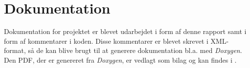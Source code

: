 \section{Dokumentation}
\label{sec:dokumentation}
Dokumentation for projektet er blevet udarbejdet i form af denne rapport samt i form af kommentarer i koden.
Disse kommentarer er blevet skrevet i XML-format, så de kan blive brugt til at generere dokumentation bl.a. med \emph{Doxygen}.
Den PDF, der er genereret fra \emph{Doxygen}, er vedlagt som bilag og kan findes i .